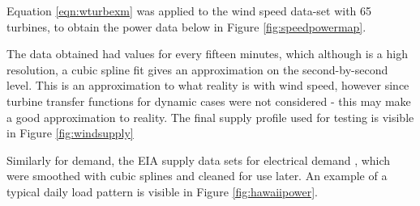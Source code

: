 Equation \ref{eqn:wturbexm} was applied to the wind speed data-set with 65 turbines, to obtain the power data below in Figure \ref{fig:speedpowermap}.

The data obtained had values for every fifteen minutes, which although is a high resolution, a cubic spline fit gives an approximation on the second-by-second level.
This is an approximation to what reality is with wind speed, however since turbine transfer functions for dynamic cases were not considered - this may make a good approximation to reality. The final supply profile used for testing is visible in Figure \ref{fig:windsupply}

Similarly for demand, the EIA supply data sets for electrical demand \cite{power:EIA}, which were smoothed with cubic splines and cleaned for use later. An example of a typical daily load pattern is visible in Figure \ref{fig:hawaiipower}.

